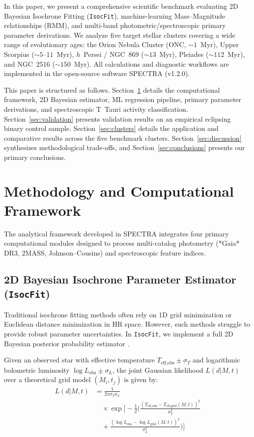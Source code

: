 \documentclass[fleqn,usenatbib]{mnras}
\begin{document}
In this paper, we present a comprehensive scientific benchmark evaluating 2D Bayesian Isochrone Fitting (\texttt{IsocFit}), machine-learning Mass--Magnitude relationships (RMM), and multi-band photometric/spectroscopic primary parameter derivations. We analyze five target stellar clusters covering a wide range of evolutionary ages: the Orion Nebula Cluster (ONC, $\sim 1$~Myr), Upper Scorpius ($\sim 5\text{--}11$~Myr), $h$~Persei / NGC~869 ($\sim 13$~Myr), Pleiades ($\sim 112$~Myr), and NGC~2516 ($\sim 150$~Myr). All calculations and diagnostic workflows are implemented in the open-source software \textsc{SPECTRA} (v1.2.0).

This paper is structured as follows. Section~\ref{sec:methods} details the computational framework, 2D Bayesian estimator, ML regression pipeline, primary parameter derivations, and spectroscopic T~Tauri activity classification. Section~\ref{sec:validation} presents validation results on an empirical eclipsing binary control sample. Section~\ref{sec:clusters} details the application and comparative results across the five benchmark clusters. Section~\ref{sec:discussion} synthesizes methodological trade-offs, and Section~\ref{sec:conclusions} presents our primary conclusions.


\section{Methodology and Computational Framework}
\label{sec:methods}

The analytical framework developed in \textsc{SPECTRA} integrates four primary computational modules designed to process multi-catalog photometry (*Gaia* DR3, 2MASS, Johnson--Cousins) and spectroscopic feature indices.

\subsection{2D Bayesian Isochrone Parameter Estimator (\texttt{IsocFit})}
\label{sec:bayesian}

Traditional isochrone fitting methods often rely on 1D grid minimization or Euclidean distance minimization in HR space. However, such methods struggle to provide robust parameter uncertainties. In \texttt{IsocFit}, we implement a full 2D Bayesian posterior probability estimator \citep{serenelli2021weighing}.

Given an observed star with effective temperature $T_{\text{eff,obs}} \pm \sigma_T$ and logarithmic bolometric luminosity $\log L_{\text{obs}} \pm \sigma_L$, the joint Gaussian likelihood $L(d | M, t)$ over a theoretical grid model $(M_i, t_j)$ is given by:
\begin{equation}
\begin{split}
    L(d | M, t) &= \frac{1}{2\pi \sigma_T \sigma_L} \\
    &\quad \times \exp \Bigg[ -\frac{1}{2} \Bigg( \frac{(T_{\text{eff,obs}} - T_{\text{eff,grid}}(M,t))^2}{\sigma_T^2} \\
    &\quad + \frac{(\log L_{\text{obs}} - \log L_{\text{grid}}(M,t))^2}{\sigma_L^2} \Bigg) \Bigg]
\end{split}
\label{eq:likelihood}
\end{equation}
\end{document}
